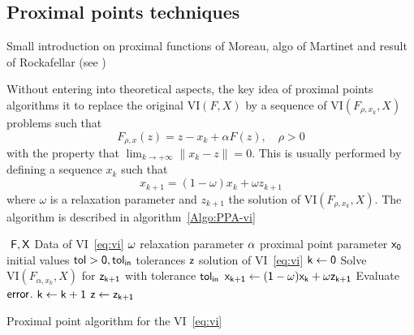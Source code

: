 \subsection{Proximal points techniques}

\begin{ndrva}
  Small introduction on proximal functions of Moreau, algo of Martinet
  and result of Rockafellar (see \cite{Chen.Teboublle_SIOPT1993})
\end{ndrva}

Without entering into theoretical aspects, the key idea of proximal points algorithms it to replace the original $\mathrm{VI}(F,X)$ by a sequence of $\mathrm{VI}(F_{\rho,x_k},X)$  problems such that 
\begin{equation}
  \label{eq:prox-algo-1}
  F_{\rho,x}(z) = z - x_k+ \alpha F(z) , \quad \rho > 0 
\end{equation}
with the property that $\lim_{ k \rightarrow +\infty} \| x_k -z \| = 0$. This is usually performed by defining a sequence $x_k$ such that
\begin{equation}
  \label{eq:prox-algo-2}
  x_{k+1} = (1-\omega) x_{k} + \omega z_{k+1}
\end{equation}
where $\omega$ is a relaxation parameter and $z_{k+1}$ the solution of $\mathrm{VI}(F_{\rho,x_k},X)$. The algorithm is described in algorithm~\ref{Algo:PPA-vi}
\begin{algorithm}
  \begin{algorithmic}
    {\sf
      \STATE $ $
      \REQUIRE $\sf F,X$ Data of VI~\eqref{eq:vi}
      \REQUIRE $\sf \omega$ relaxation parameter
      \REQUIRE $\sf \alpha$ proximal point parameter
      \REQUIRE $\sf x_0$ initial values
      \REQUIRE $\sf tol >0, tol_{in}$ tolerances
      \ENSURE  $\sf z$ solution of VI~\eqref{eq:vi}
      \STATE   $\sf k \leftarrow 0$ 
      \STATE Solve $\mathrm{VI}(F_{\alpha,x_k},X)$ for $\sf z_{k+1}$ with tolerance $\sf tol_{in}$
      \STATE $\sf x_{k+1} \leftarrow (1-\omega) x_{k} + \omega z_{k+1}$
      \STATE Evaluate $\sf error$.
      \STATE $\sf k \leftarrow k+1$
      \ENDWHILE
      \STATE $\sf z \leftarrow z_{k+1}$ 
    }
  \end{algorithmic}
  \caption{Proximal point algorithm for the VI~\eqref{eq:vi}}  \label{Algo:PPA-vi}
\end{algorithm}

